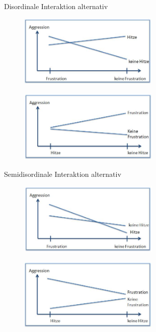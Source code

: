 \documentclass{beamer}
\begin{document}
	
	\begin{frame}{Disordinale Interaktion alternativ}
		\begin{figure}
			\centering
			\includegraphics[width=0.6\textwidth]{Bilder/DisordinaleInteraktion1.jpg}
		\end{figure}
		\begin{figure}
			\centering
			\includegraphics[width=0.6\textwidth]{Bilder/DisordinaleInteraktion2.jpg}
		\end{figure}
	\end{frame}
	
	
	\begin{frame}{Semidisordinale Interaktion alternativ}
		\begin{figure}
			\centering
			\includegraphics[width=0.6\textwidth]{Bilder/HybrideInteraktion1.jpg}
		\end{figure}
		\begin{figure}
			\centering
			\includegraphics[width=0.6\textwidth]{Bilder/HybrideInteraktion2.jpg}
		\end{figure}
	\end{frame}
	
\end{document}
